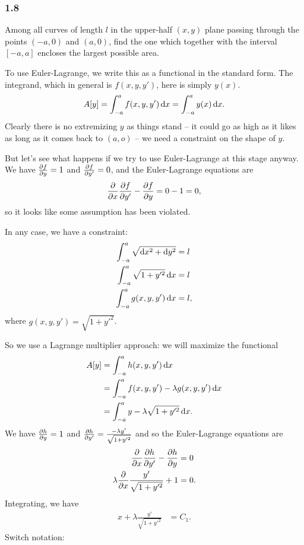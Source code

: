 \subsubsection{1.8}
\begin{mdframed}
  Among all curves of length $l$ in the upper-half $(x, y)$ plane passing through the points $(-a, 0)$ and $(a, 0)$, find the one which together with
  the interval $[-a, a]$ encloses the largest possible area.
\end{mdframed}

To use Euler-Lagrange, we write this as a functional in the standard form. The integrand, which in general is $f(x, y, y')$, here is simply $y(x)$.
\begin{align*}
  A[y] = \int_{-a}^{a} f(x, y, y') \dx = \int_{-a}^{a} y(x) \dx.
\end{align*}
Clearly there is no extremizing $y$ as things stand -- it could go as high as it likes as long as it comes back to $(a, o)$ -- we need a constraint on
the shape of $y$.

But let's see what happens if we try to use Euler-Lagrange at this stage anyway. We have $\frac{\partial f}{\partial y} = 1$ and $\frac{\partial f}{\partial y'} = 0$, and the Euler-Lagrange
equations are
\begin{align*}
  \frac{\partial}{\partial x} \frac{\partial f}{\partial y'} - \frac{\partial f}{\partial y} = 0 - 1 = 0,
\end{align*}
so it looks like some assumption has been violated.

In any case, we have a constraint:
\begin{align*}
  \int_{-a}^a \sqrt{\dx^2 + \dy^2} &= l \\
  \int_{-a}^a \sqrt{1 + y'^2} \dx &= l \\
  \int_{-a}^a g(x, y, y') \dx &= l,
\end{align*}
where $g(x,y,y') = \sqrt{1 + y'^2}$.

So we use a Lagrange multiplier approach: we will maximize the functional
\begin{align*}
  A[y]
  &= \int_{-a}^{a} h(x, y, y') \dx \\
  &= \int_{-a}^{a} f(x, y, y') - \lambda g(x, y, y') \dx \\
  &= \int_{-a}^{a} y - \lambda \sqrt{1 + y'^2} \dx.
\end{align*}
We have $\frac{\partial h}{\partial y} = 1$ and $\frac{\partial h}{\partial y'} = \frac{-\lambda y'}{\sqrt{1 + y'^2}}$ and so the Euler-Lagrange equations are
\begin{align*}
  \frac{\partial}{\partial x} \frac{\partial h}{\partial y'} - \frac{\partial h}{\partial y} &= 0 \\
  \lambda \frac{\partial}{\partial x} \frac{y'}{\sqrt{1 + y'^2}} + 1 &= 0.
\end{align*}
Integrating, we have
\begin{align*}
  x + \lambda \frac{y'}{\sqrt{1 + y'^2}} &= C_1.
\end{align*}
Switch notation:

